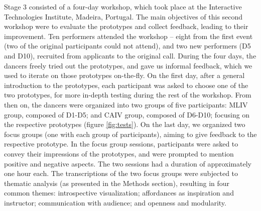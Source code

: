 Stage 3 consisted of a four-day workshop, which took place at the Interactive Technologies Institute, Madeira, Portugal. The main objectives of this second workshop were to evaluate the prototypes and collect feedback, leading to their improvement. Ten performers attended the workshop – eight from the first event (two of the original participants could not attend), and two new performers (D5 and D10), recruited from applicants to the original call.
During the four days, the dancers freely tried out the prototypes, and gave us informal feedback, which we used to iterate on those prototypes on-the-fly. On the first day, after a general introduction to the prototypes, each participant was asked to choose one of the two prototypes, for more in-depth testing during the rest of the workshop. From then on, the dancers were organized into two groups of five participants: MLIV group, composed of D1-D5; and CAIV group, composed of D6-D10; focusing on the respective prototypes (figure \ref{fig:tests}). On the last day, we organized two focus groups (one with each group of participants), aiming to give feedback to the respective prototype. In the focus group sessions, participants were asked to convey their impressions of the prototypes, and were prompted to mention positive and negative aspects. The two sessions had a duration of approximately one hour each. The transcriptions of the two focus groups were subjected to thematic analysis (as presented in the Methods section), resulting in four common themes: introspective visualization; affordances as inspiration and instructor; communication with audience; and openness and modularity.

